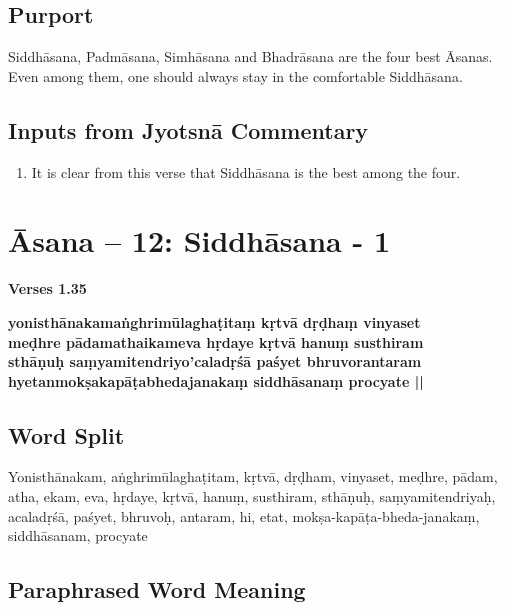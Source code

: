 \subsection*{Purport}

Siddhāsana, Padmāsana, Simhāsana and Bhadrāsana are the four best Āsanas. Even among them, one should always stay in the comfortable Siddhāsana.

\subsection*{Inputs from Jyotsnā Commentary}

\begin{enumerate}
\item It is clear from this verse that Siddhāsana is the best among the four. 
\end{enumerate}

\section*{Āsana -- 12: Siddhāsana - 1}

\noindent 
\textbf{Verses 1.35}

\begin{shloka}
\textbf{yonisthānakamaṅghrimūlaghaṭitaṃ kṛtvā dṛḍhaṃ vinyaset}\\
\textbf{meḍhre pādamathaikameva hṛdaye kṛtvā hanuṃ susthiram}\\
\textbf{sthāṇuḥ saṃyamitendriyo'caladṛśā paśyet bhruvorantaram}\\
\textbf{hyetanmokṣakapāṭabhedajanakaṃ siddhāsanaṃ procyate ||}
\end{shloka}

\subsection*{Word Split}

Yonisthānakam, aṅghrimūlaghaṭitam, kṛtvā, dṛḍham, vinyaset, meḍhre, pādam, atha, ekam, eva, hṛdaye, kṛtvā, hanuṃ, susthiram, sthāṇuḥ, saṃyamitendriyaḥ, acaladṛśā, paśyet, bhruvoḥ, antaram, hi, etat, mokṣa-kapāṭa-bheda-janakaṃ, siddhāsanam, procyate

\subsection*{Paraphrased Word Meaning}

